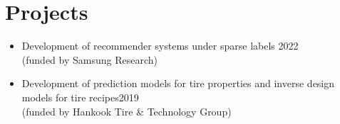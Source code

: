 
\section{Projects}

\begin{itemize}[nosep, wide=0pt]
    \item \small Development of recommender systems under sparse labels \hfill 2022\\ \hspace{5mm}(funded by Samsung Research)
\end{itemize}
\begin{itemize}[nosep, wide=0pt]
    \item \small Development of prediction models for tire properties and inverse design models for tire recipes\hfill 2019\\ \hspace{5mm}(funded by Hankook Tire \& Technology Group)
\end{itemize}



